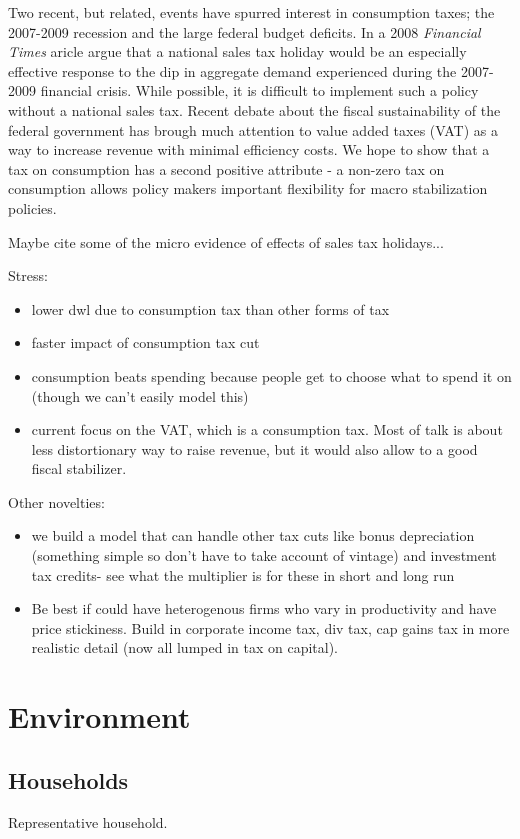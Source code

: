 \documentclass[article,11pt,letterpaper,fleqn]{article}
\theoremstyle{definition}
\numberwithin{equation}{section}
\newcommand{\cn}{\citeasnoun} %
\begin{document}
Two recent, but related, events have spurred interest in consumption taxes; the 2007-2009 recession and the large federal budget deficits.  In a 2008 \emph{Financial Times} aricle \cn{LK_FT2008} argue that a national sales tax holiday would be an especially effective response to the dip in aggregate demand experienced during the 2007-2009 financial crisis.  While possible, it is difficult to implement such a policy without a national sales tax.  Recent debate about the fiscal sustainability of the federal government has brough much attention to value added taxes (VAT) as a way to increase revenue with minimal efficiency costs.  We hope to show that a tax on consumption has a second positive attribute - a non-zero tax on consumption allows policy makers important flexibility for macro stabilization policies.


Maybe cite some of the micro evidence of effects of sales tax holidays...

Stress:
\begin{itemize}
\item lower dwl due to consumption tax than other forms of tax
\item faster impact of consumption tax cut
\item consumption beats spending because people get to choose what to spend it on (though we can't easily model this)
\item current focus on the VAT, which is a consumption tax.  Most of talk is about less distortionary way to raise revenue, but it would also allow to a good fiscal stabilizer.
\end{itemize}
Other novelties:
\begin{itemize}
\item we build a model that can handle other tax cuts like bonus depreciation (something simple so don't have to take account of vintage) and investment tax credits- see what the multiplier is for these in short and long run
\item Be best if could have heterogenous firms who vary in productivity and have price stickiness.  Build in corporate income tax, div tax, cap gains tax in more realistic detail (now all lumped in tax on capital).
\end{itemize}

\section{Environment}
\label{sec:model}

\subsection{Households}
Representative household.
\end{document}
